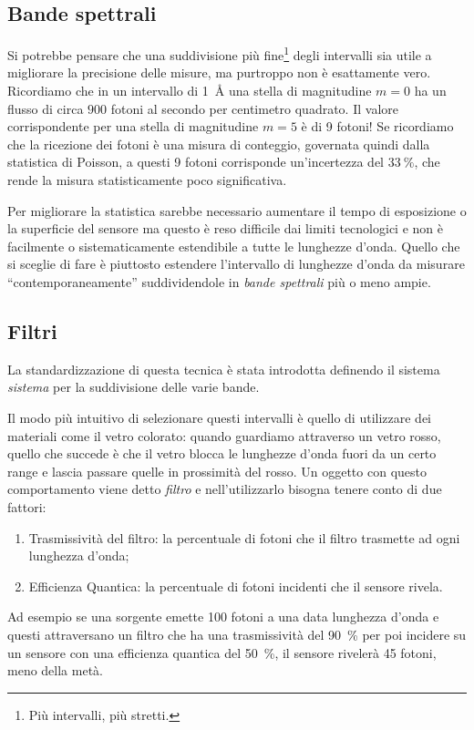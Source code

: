     \subsection{Bande spettrali}
        Si potrebbe pensare che una suddivisione più fine\footnote{Più intervalli, più stretti.} degli intervalli sia utile a migliorare la precisione delle misure, ma purtroppo non è esattamente vero. Ricordiamo che in un intervallo di \SI{1}{\angstrom} una stella di magnitudine $m = \num{0}$ ha un flusso di circa $\num{900}$ fotoni al secondo per centimetro quadrato. Il valore corrispondente per una stella di magnitudine $m = \num{5}$ è di \num{9} fotoni! Se ricordiamo che la ricezione dei fotoni è una misura di conteggio, governata quindi dalla statistica di Poisson, a questi \num{9} fotoni corrisponde un'incertezza del $\SI{33}{\percent}$, che rende la misura statisticamente poco significativa.

        Per migliorare la statistica sarebbe necessario aumentare il tempo di esposizione o la superficie del sensore ma questo è reso difficile dai limiti tecnologici e non è facilmente o sistematicamente estendibile a tutte le lunghezze d'onda. Quello che si sceglie di fare è piuttosto estendere l'intervallo di lunghezze d'onda da misurare ``contemporaneamente'' suddividendole in \emph{bande spettrali} più o meno ampie.
    \subsection{Filtri}
        La standardizzazione di questa tecnica è stata introdotta definendo il sistema \emph{sistema \ubvri} per la suddivisione delle varie bande.
        
        Il modo più intuitivo di selezionare questi intervalli è quello di utilizzare dei materiali come il vetro colorato: quando guardiamo attraverso un vetro rosso, quello che succede è che il vetro blocca le lunghezze d'onda fuori da un certo range e lascia passare quelle in prossimità del rosso. Un oggetto con questo comportamento viene detto \emph{filtro} e nell'utilizzarlo bisogna tenere conto di due fattori:
        \begin{enumerate}[label = \arabic{enumi}.]
            \item Trasmissività del filtro: la percentuale di fotoni che il filtro trasmette ad ogni lunghezza d'onda;
            \item Efficienza Quantica: la percentuale di fotoni incidenti che il sensore rivela. 
        \end{enumerate}
        Ad esempio se una sorgente emette \num{100} fotoni a una data lunghezza d'onda e questi attraversano un filtro che ha una trasmissività del \SI{90}{\percent} per poi incidere su un sensore con una efficienza quantica del \SI{50}{\percent}, il sensore rivelerà \num{45} fotoni, meno della metà.

